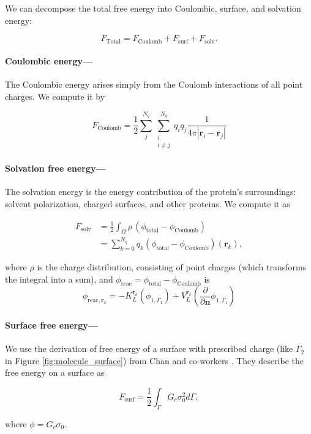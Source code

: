 
We can decompose the total free energy into Coulombic, surface, and solvation energy:

\begin{equation}
F_\text{Total} = F_\text{Coulomb} + F_\text{surf} + F_\text{solv}.
\end{equation}

\medskip

\paragraph*{Coulombic energy---}

The Coulombic energy arises simply from the Coulomb interactions of all point charges. We compute it by

\begin{equation} \label{eq:coul_energy}
F_\text{Coulomb} = \frac{1}{2} \sum_j^{N_q}\sum^{N_q}_{\substack{i\\ i\neq j}} q_iq_j\frac{1}{4\pi |\mathbf{r}_i-\mathbf{r}_j|}
\end{equation}

\paragraph*{Solvation free energy---}

The solvation energy is the energy contribution of the protein's surroundings: solvent polarization, charged surfaces, and other proteins. We compute it as

\begin{align} \label{eq:solv_energy}
F_{\text{solv}} &= \frac{1}{2} \int_{\Omega} \rho \,(\phi_{\text{total}} - \phi_{\text{Coulomb}}) \\
&= \sum_{k=0}^{N_q} q_k (\phi_{\text{total}} - \phi_{\text{Coulomb}})(\mathbf{r}_k),
\end{align}

\noindent where $\rho$ is the charge distribution, consisting of point charges (which transforms the integral into a sum), and $\phi_\text{reac} = \phi_{\text{total}} - \phi_{\text{Coulomb}}$ is
%
\begin{equation} \label{eq:phi_reac_bem}
\phi_{\text{reac},\mathbf{r}_k} = -K_{L}^{\mathbf{r}_k}(\phi_{1,\Gamma_1}) + V_{L}^{\mathbf{r}_k} \left(\frac{\partial}{\partial \mathbf{n}}\phi_{1,\Gamma_1} \right) 
\end{equation}

\paragraph*{Surface free energy---}

We use the derivation of free energy of a surface with prescribed charge (like $\Gamma_2$ in Figure \ref{fig:molecule_surface}) from Chan and co-workers \cite{ChanMitchell1983,CarnieChan1993}. They describe the free energy on a surface as

\begin{equation} \label{eq:energy_surf}
F_\text{surf} = \frac{1}{2} \int_{\Gamma} G_c \sigma_0^2 d\Gamma, 
\end{equation} 

\noindent where $\phi = G_c \sigma_0$.
